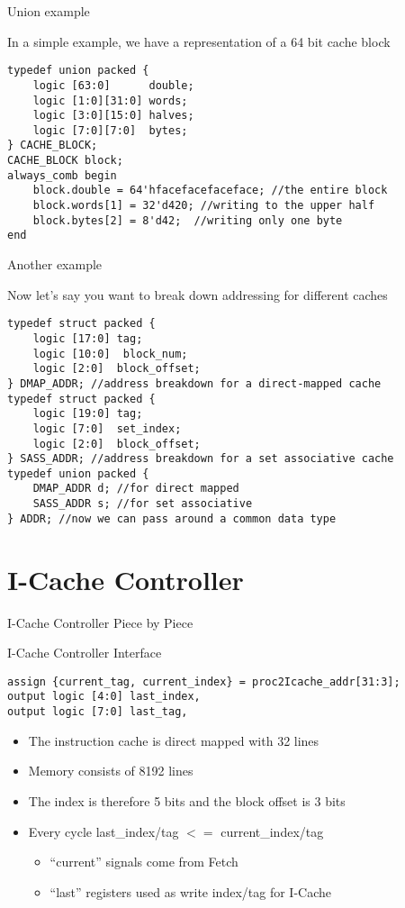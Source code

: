 \documentclass[table,dvipsnames]{beamer}
\begin{document}
\begin{frame}[fragile]{Union example}
    \item In a simple example, we have a representation of a 64 bit cache block 
\begin{verbatim}
typedef union packed {
    logic [63:0]      double;
    logic [1:0][31:0] words;
    logic [3:0][15:0] halves;
    logic [7:0][7:0]  bytes;
} CACHE_BLOCK;
CACHE_BLOCK block;
always_comb begin
    block.double = 64'hfacefacefaceface; //the entire block
    block.words[1] = 32'd420; //writing to the upper half 
    block.bytes[2] = 8'd42;  //writing only one byte
end
\end{verbatim}
\end{frame}

\begin{frame}[fragile]{Another example}
    \item Now let's say you want to break down addressing for different caches
\begin{verbatim}
typedef struct packed {
    logic [17:0] tag;
    logic [10:0]  block_num;
    logic [2:0]  block_offset;
} DMAP_ADDR; //address breakdown for a direct-mapped cache
typedef struct packed {
    logic [19:0] tag;
    logic [7:0]  set_index;
    logic [2:0]  block_offset;
} SASS_ADDR; //address breakdown for a set associative cache
typedef union packed {
    DMAP_ADDR d; //for direct mapped
    SASS_ADDR s; //for set associative
} ADDR; //now we can pass around a common data type
\end{verbatim}
\end{frame}

\section{I-Cache Controller}
\begin{frame}[fragile]{I-Cache Controller Piece by Piece}
	\begin{block}{I-Cache Controller Interface}
		\begin{verbatim}
assign {current_tag, current_index} = proc2Icache_addr[31:3]; 
output logic [4:0] last_index,
output logic [7:0] last_tag,
		\end{verbatim}
			\begin{itemize}
			\item The instruction cache is direct mapped with 32 lines
			\item Memory consists of 8192 lines
			\item The index is therefore 5 bits and the block offset is 3 bits
			\item Every cycle last\_index/tag $<=$ current\_index/tag
			\begin{itemize} 
				\item ``current'' signals come from Fetch
				\item ``last'' registers used as write index/tag for I-Cache 
			\end{itemize}	
		\end{itemize}
	\end{block}	
\end{frame}
\end{document}

